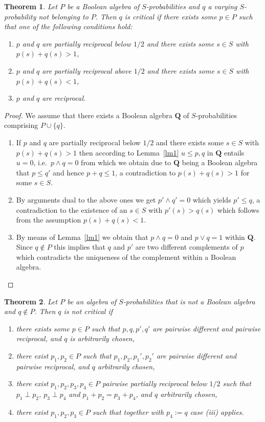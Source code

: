 \documentclass[12pt]{article}
\newtheorem{theorem}{Theorem}[section]
\begin{document}
\begin{theorem}\label{th4}
Let $P$ be a Boolean algebra of $S$-probabilities and $q$ a varying $S$-probability not belonging to $P$. Then $q$ is critical if there exists some $p\in P$ such that one of the following conditions hold:
\begin{enumerate}
\item[{\rm(i)}] $p$ and $q$ are partially reciprocal below $1/2$ and there exists some $s\in S$ with $p(s)+q(s)>1$,
\item[{\rm(ii)}] $p$ and $q$ are partially reciprocal above $1/2$ and there exists some $s\in S$ with $p(s)+q(s)<1$,
\item[{\rm(iii)}] $p$ and $q$ are reciprocal.
\end{enumerate} 
\end{theorem}

\begin{proof}
We assume that there exists a Boolean algebra $\mathbf Q$ of $S$-probabilities comprising $P\cup\{q\}$.
\begin{enumerate}
\item[(i)] If $p$ and $q$ are partially reciprocal below $1/2$ and there exists some $s\in S$ with $p(s)+q(s)>1$ then according to Lemma~\ref{lm1} $u\le p,q $ in $\mathbf Q$ entails $u=0$, i.e.\ $p\wedge q=0$ from which we obtain due to $\mathbf Q$ being a Boolean algebra that $p\le q'$ and hence $p+q\leq 1$, a contradiction to $p(s)+q(s)>1$ for some $s\in S$.
\item[(ii)] By arguments dual to the above ones we get $p'\wedge q'=0$ which yields $p'\leq q$, a contradiction to the existence of an $s\in S$ with $p'(s)>q(s)$ which follows from the assumption $p(s)+q(s)<1$.
\item[(iii)] By means of Lemma~\ref{lm1} we obtain that $p\wedge q=0$ and $p\vee q=1$ within $\mathbf Q$. Since $q\notin P$ this implies that $q$ and $p'$ are two different complements of $p$ which contradicts the uniqueness of the complement within a Boolean algebra.
\end{enumerate}
\end{proof}

\begin{theorem}\label{th5}
Let $P$ be an algebra of $S$-probabilities that is {\em not} a Boolean algebra and $q\notin P$. Then $q$ is {\em not} critical if
\begin{enumerate}
\item[{\rm(i)}] there exists some $p\in P$ such that $p,q,p',q'$ are pairwise different and pairwise reciprocal, and $q$ is arbitrarily chosen,
\item[{\rm(ii)}] there exist $p_1,p_2\in P$ such that $p_1,p_2,p_1',p_2'$ are pairwise different and pairwise reciprocal, and $q$ arbitrarily chosen,
\item[{\rm(iii)}] there exist $p_1,p_2,p_3,p_4\in P$ pairwise partially reciprocal below $1/2$ such that $p_1\perp p_2$, $p_3\perp p_4$ and $p_1+p_2=p_3+p_4$, and $q$ arbitrarily chosen,
\item[{\rm(iv)}] there exist $p_1,p_2,p_3\in P$ such that together with $p_4:=q$ case {\rm(iii)} applies.
\end{enumerate}
\end{theorem}
\end{document}

